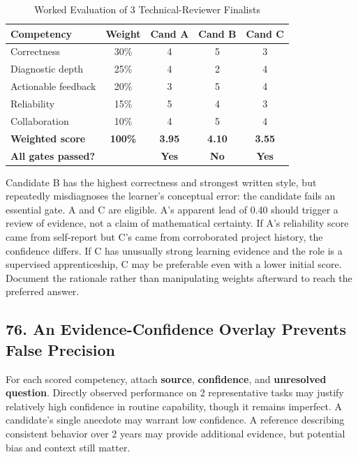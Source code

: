 \begin{table}[htbp]
\centering
\small
\caption{Worked Evaluation of 3 Technical-Reviewer Finalists}
\label{tab:reviewer_comparison}
\begin{tabularx}{\columnwidth}{p{2.8cm} c c c c}
\toprule
\textbf{Competency} & \textbf{Weight} & \textbf{Cand A} & \textbf{Cand B} & \textbf{Cand C} \\
\midrule
Correctness & 30\% & 4 & 5 & 3 \\
Diagnostic depth & 25\% & 4 & 2 & 4 \\
Actionable feedback & 20\% & 3 & 5 & 4 \\
Reliability & 15\% & 5 & 4 & 3 \\
Collaboration & 10\% & 4 & 5 & 4 \\
\midrule
\textbf{Weighted score} & \textbf{100\%} & \textbf{3.95} & \textbf{4.10} & \textbf{3.55} \\
\textbf{All gates passed?} & & \textbf{Yes} & \textbf{No} & \textbf{Yes} \\
\bottomrule
\end{tabularx}
\end{table}

Candidate B has the highest correctness and strongest written style, but repeatedly misdiagnoses the learner's conceptual error: the candidate fails an essential gate. A and C are eligible. A's apparent lead of 0.40 should trigger a review of evidence, not a claim of mathematical certainty. If A's reliability score came from self-report but C's came from corroborated project history, the confidence differs. If C has unusually strong learning evidence and the role is a supervised apprenticeship, C may be preferable even with a lower initial score. Document the rationale rather than manipulating weights afterward to reach the preferred answer.

\subsection*{76. An Evidence-Confidence Overlay Prevents False Precision}

For each scored competency, attach \textbf{source}, \textbf{confidence}, and \textbf{unresolved question}. Directly observed performance on 2 representative tasks may justify relatively high confidence in routine capability, though it remains imperfect. A candidate's single anecdote may warrant low confidence. A reference describing consistent behavior over 2 years may provide additional evidence, but potential bias and context still matter.

